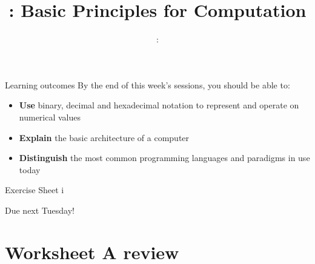 \usepackage{../../beamerthemeFalmouthGamesAcademy}
\usepackage{multimedia}
\graphicspath{ {../../} }

\lstset{language=Python
}

\usepackage[normalem]{ulem}
\usepackage{wasysym}

\usepackage{pdfpages}

\usetikzlibrary{arrows,automata}




\title{\sessionnumber: Basic Principles for Computation}
\subtitle{\modulecode: \moduletitle}

\frame{\titlepage} 

\begin{frame}{Learning outcomes}
	By the end of this week's sessions, you should be able to:
	\begin{itemize}
		\item \textbf{Use} binary, decimal and hexadecimal notation to represent and operate on numerical values
		\item \textbf{Explain} the basic architecture of a computer
		\item \textbf{Distinguish} the most common programming languages and paradigms in use today
	\end{itemize}
\end{frame}





\begin{frame}{Exercise Sheet i}
  \begin{center}
      Due next Tuesday!
  \end{center}
\end{frame}





\part{Worksheet A review}
\frame{\partpage}


